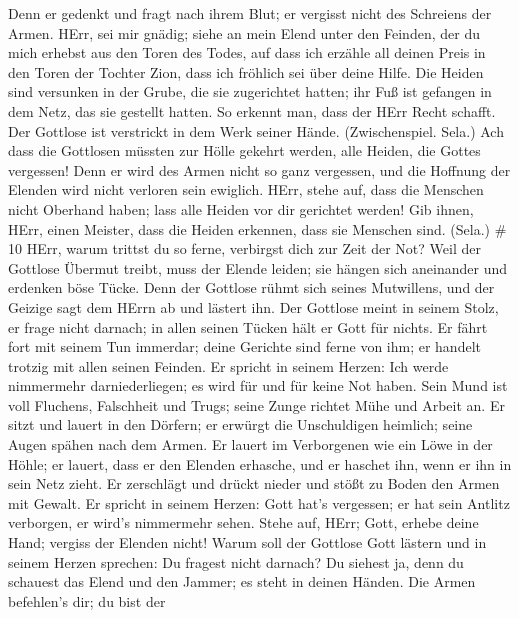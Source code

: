 Denn er gedenkt und fragt nach ihrem Blut; er vergisst nicht des
Schreiens der Armen.  HErr, sei mir gnädig; siehe an mein
Elend unter den Feinden, der du mich erhebst aus den Toren des Todes,
 auf dass ich erzähle all deinen Preis in den Toren der
Tochter Zion, dass ich fröhlich sei über deine Hilfe.  Die
Heiden sind versunken in der Grube, die sie zugerichtet hatten; ihr Fuß
ist gefangen in dem Netz, das sie gestellt hatten.  So
erkennt man, dass der HErr Recht schafft. Der Gottlose ist verstrickt in
dem Werk seiner Hände. (Zwischenspiel. Sela.)  Ach dass die
Gottlosen müssten zur Hölle gekehrt werden, alle Heiden, die Gottes
vergessen!  Denn er wird des Armen nicht so ganz vergessen,
und die Hoffnung der Elenden wird nicht verloren sein ewiglich.
 HErr, stehe auf, dass die Menschen nicht Oberhand haben;
lass alle Heiden vor dir gerichtet werden!  Gib ihnen,
HErr, einen Meister, dass die Heiden erkennen, dass sie Menschen sind.
(Sela.) \# 10  HErr, warum trittst du so ferne, verbirgst
dich zur Zeit der Not?  Weil der Gottlose Übermut treibt,
muss der Elende leiden; sie hängen sich aneinander und erdenken böse
Tücke.  Denn der Gottlose rühmt sich seines Mutwillens, und
der Geizige sagt dem HErrn ab und lästert ihn.  Der Gottlose
meint in seinem Stolz, er frage nicht darnach; in allen seinen Tücken
hält er Gott für nichts.  Er fährt fort mit seinem Tun
immerdar; deine Gerichte sind ferne von ihm; er handelt trotzig mit
allen seinen Feinden.  Er spricht in seinem Herzen: Ich
werde nimmermehr darniederliegen; es wird für und für keine Not haben.
 Sein Mund ist voll Fluchens, Falschheit und Trugs; seine
Zunge richtet Mühe und Arbeit an.  Er sitzt und lauert in
den Dörfern; er erwürgt die Unschuldigen heimlich; seine Augen spähen
nach dem Armen.  Er lauert im Verborgenen wie ein Löwe in
der Höhle; er lauert, dass er den Elenden erhasche, und er haschet ihn,
wenn er ihn in sein Netz zieht.  Er zerschlägt und drückt
nieder und stößt zu Boden den Armen mit Gewalt.  Er spricht
in seinem Herzen: Gott hat's vergessen; er hat sein Antlitz verborgen,
er wird's nimmermehr sehen.  Stehe auf, HErr; Gott, erhebe
deine Hand; vergiss der Elenden nicht!  Warum soll der
Gottlose Gott lästern und in seinem Herzen sprechen: Du fragest nicht
darnach?  Du siehest ja, denn du schauest das Elend und den
Jammer; es steht in deinen Händen. Die Armen befehlen's dir; du bist der
